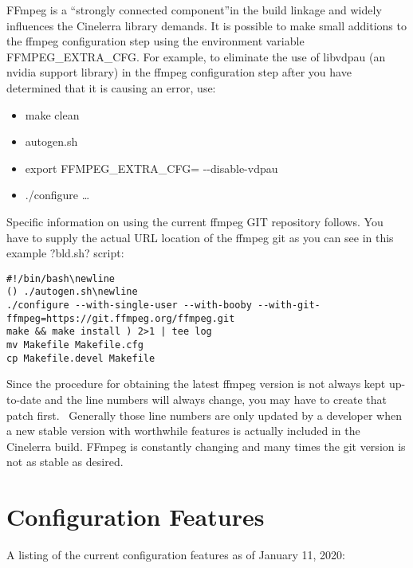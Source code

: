 FFmpeg is a ``strongly connected component''in the build linkage and widely influences the Cinelerra library demands.  It is possible to make small additions to the ffmpeg configuration step using the environment variable FFMPEG\_EXTRA\_CFG.  For example, to eliminate the use of libvdpau (an nvidia support library) in the ffmpeg configuration step after you have determined that it is causing an error, use:

\begin{itemize}[label={},nosep]
	\item make clean
	\item autogen.sh
	\item export FFMPEG\_EXTRA\_CFG={\textquotedbl} -{}-disable-vdpau{\textquotedbl} 
	\item ./configure {\dots}
\end{itemize}
\medskip

Specific information on using the current ffmpeg GIT repository follows.  You have to supply the actual URL location of the ffmpeg git as you can see in this example ?bld.sh? script:
\medskip

\begin{lstlisting}[numbers=none]
#!/bin/bash\newline
() ./autogen.sh\newline
./configure --with-single-user --with-booby --with-git-ffmpeg=https://git.ffmpeg.org/ffmpeg.git
make && make install ) 2>1 | tee log
mv Makefile Makefile.cfg
cp Makefile.devel Makefile
\end{lstlisting}

Since the procedure for obtaining the latest ffmpeg version is not always kept up-to-date and the line numbers will always change, you may have to create that patch first. \ Generally those line numbers are only updated by a developer when a new stable version with worthwhile features is actually included in the Cinelerra build. FFmpeg is constantly changing and many times the git version is not as stable as desired.

\section{Configuration Features}
\label{sec:Configuration Features}

A listing of the current configuration features as of January 11, 2020:

